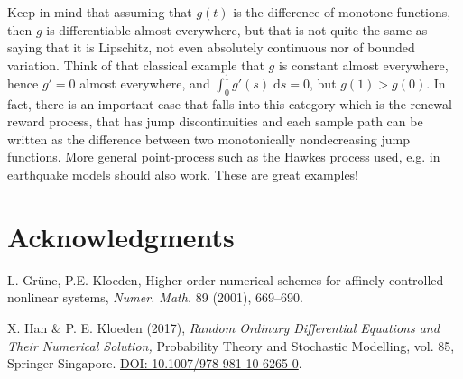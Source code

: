 \documentclass[reqno,12pt]{amsart}
\theoremstyle{plain}%
\theoremstyle{definition}
\newcommand{\dontshow}[1]{}
\begin{document}
Keep in mind that assuming that $g(t)$ is the difference of monotone functions, then $g$ is differentiable almost everywhere, but that is not quite the same as saying that it is Lipschitz, not even absolutely continuous nor of bounded variation. Think of that classical example that $g$ is constant almost everywhere, hence $g' = 0$ almost everywhere, and $\int_0^1 g'(s) \;\mathrm{d}s = 0$, but $g(1) > g(0)$. In fact, there is an important case that falls into this category which is the renewal-reward process, that has jump discontinuities and each sample path can be written as the difference between two monotonically nondecreasing jump functions. More general point-process such as the Hawkes process used, e.g. in earthquake models should also work. These are great examples!

\dontshow{For the power function $t \mapsto t^\theta$, for $t \geq 0$, with $0<\theta\leq 1$, we have, for $t > s \geq 0$,
\begin{align*}
    \frac{|t^{\theta} - s^{\theta}|}{|t - s|^\theta} = \frac{\left|1 - \left(\frac{s}{t}\right)^\theta\right|}{\left|1 - \left(\frac{s}{t}\right)\right|^\theta} \leq \frac{\left|1 - \left(\frac{s}{t}\right)\right|}{\left|1 - \left(\frac{s}{t}\right)\right|} = 1,
\end{align*}
where we used that $(s/t)^\theta \geq (s/t)$, since $0 \leq s/t < 1$ and $0 < \theta \leq 1$, and, similarly, that $(1 - s/t)^\theta \geq (1 - s/t)$. This shows that $t \mapsto t^\theta$ is H\"older continuous with H\"older exponent $\theta$ and H\"older constant $1$.
}


\section*{Acknowledgments}


\begin{thebibliography}{25}
     L. Gr\"une, P.E. Kloeden, Higher order numerical schemes for affinely controlled nonlinear systems, \emph{Numer. Math.} 89 (2001), 669--690.


     X. Han \& P. E. Kloeden (2017), \emph{Random Ordinary Differential Equations and Their Numerical Solution,} Probability Theory and Stochastic Modelling, vol. 85, Springer Singapore. \href{https://link.springer.com/book/10.1007/978-981-10-6265-0}{DOI: 10.1007/978-981-10-6265-0}.
\end{thebibliography}
\end{document}
